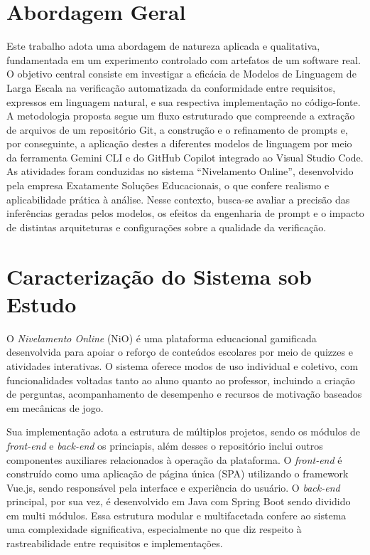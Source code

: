 
\section{Abordagem Geral}
Este trabalho adota uma abordagem de natureza aplicada e qualitativa, fundamentada em um experimento controlado com artefatos de um software real. O objetivo central consiste em investigar a eficácia de Modelos de Linguagem de Larga Escala  na verificação automatizada da conformidade entre requisitos, expressos em linguagem natural, e sua respectiva implementação no código-fonte. A metodologia proposta segue um fluxo estruturado que compreende a extração de arquivos de um repositório Git, a construção e o refinamento de prompts e, por conseguinte, a aplicação destes a diferentes modelos de linguagem por meio da ferramenta Gemini CLI e do GitHub Copilot integrado ao Visual Studio Code. As atividades foram conduzidas no sistema “Nivelamento Online”, desenvolvido pela empresa Exatamente Soluções Educacionais, o que confere realismo e aplicabilidade prática à análise. Nesse contexto, busca-se avaliar a precisão das inferências geradas pelos modelos, os efeitos da engenharia de prompt e o impacto de distintas arquiteturas e configurações sobre a qualidade da verificação.

\section{Caracterização do Sistema sob Estudo}

O \textit{Nivelamento Online} (NiO) é uma plataforma educacional gamificada desenvolvida para apoiar o reforço de conteúdos escolares por meio de quizzes e atividades interativas. O sistema oferece modos de uso individual e coletivo, com funcionalidades voltadas tanto ao aluno quanto ao professor, incluindo a criação de perguntas, acompanhamento de desempenho e recursos de motivação baseados em mecânicas de jogo. 

Sua implementação adota a estrutura de múltiplos projetos, sendo os módulos de \textit{front-end} e \textit{back-end} os princiapis, além desses o repositório inclui outros componentes auxiliares relacionados à operação da plataforma. O \textit{front-end} é construído como uma aplicação de página única (SPA) utilizando o framework Vue.js, sendo responsável pela interface e experiência do usuário. O \textit{back-end} principal, por sua vez, é desenvolvido em Java com Spring Boot sendo dividido em multi módulos. Essa estrutura modular e multifacetada confere ao sistema uma complexidade significativa, especialmente no que diz respeito à rastreabilidade entre requisitos e implementações.


